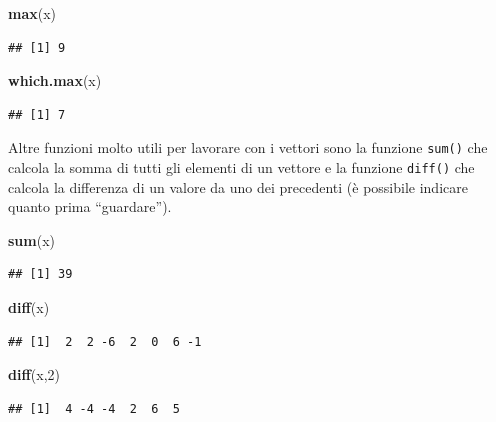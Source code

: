 \documentclass[]{book}
\newenvironment{Shaded}{\begin{snugshade}}{\end{snugshade}}
\newcommand{\DecValTok}[1]{\textcolor[rgb]{0.00,0.00,0.81}{#1}}
\newcommand{\KeywordTok}[1]{\textcolor[rgb]{0.13,0.29,0.53}{\textbf{#1}}}
\newcommand{\NormalTok}[1]{#1}
\begin{document}
\begin{Shaded}
\begin{Highlighting}[]
\KeywordTok{max}\NormalTok{(x)}
\end{Highlighting}
\end{Shaded}

\begin{verbatim}
## [1] 9
\end{verbatim}

\begin{Shaded}
\begin{Highlighting}[]
\KeywordTok{which.max}\NormalTok{(x)}
\end{Highlighting}
\end{Shaded}

\begin{verbatim}
## [1] 7
\end{verbatim}

Altre funzioni molto utili per lavorare con i vettori sono la funzione \texttt{sum()} che calcola la somma di tutti gli elementi di un vettore e la funzione \texttt{diff()}
che calcola la differenza di un valore da uno dei precedenti (è possibile indicare quanto prima ``guardare'').

\begin{Shaded}
\begin{Highlighting}[]
\KeywordTok{sum}\NormalTok{(x)}
\end{Highlighting}
\end{Shaded}

\begin{verbatim}
## [1] 39
\end{verbatim}

\begin{Shaded}
\begin{Highlighting}[]
\KeywordTok{diff}\NormalTok{(x)}
\end{Highlighting}
\end{Shaded}

\begin{verbatim}
## [1]  2  2 -6  2  0  6 -1
\end{verbatim}

\begin{Shaded}
\begin{Highlighting}[]
\KeywordTok{diff}\NormalTok{(x,}\DecValTok{2}\NormalTok{)}
\end{Highlighting}
\end{Shaded}

\begin{verbatim}
## [1]  4 -4 -4  2  6  5
\end{verbatim}
\end{document}
